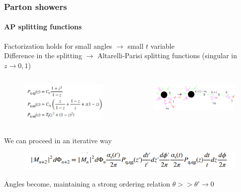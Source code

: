 \documentclass[aspectratio=43]{beamer}
\begin{document}
\begin{frame}

	\frametitle{Parton showers}
	\framesubtitle{AP splitting functions}
	
	\footnotesize Factorization holds for small angles $\rightarrow$ small $t$ variable \\
	\footnotesize Difference in the splitting $\rightarrow$ Altarelli-Parisi splitting functions (singular in $z \rightarrow 0, 1$)
	
		
	\begin{columns}
	
			 
		\begin{figure}
			\includegraphics[width = 5 cm]{plots/AP_splitting.png}
		\end{figure}
		
		
		\begin{figure}
			\includegraphics[width = 6.5 cm]{plots/AP_iteration_plot.png}
		\end{figure}

	\end{columns}

	\vspace{0.4cm}
	
	\footnotesize We can proceed in an iterative way	
	\begin{figure}
		\includegraphics[width = 9 cm]{plots/AP_iteration_eq.png}
	\end{figure}

	\footnotesize Angles become, maintaining a strong ordering relation $\theta >> \theta' \rightarrow 0$
	
\end{frame}
\end{document}
